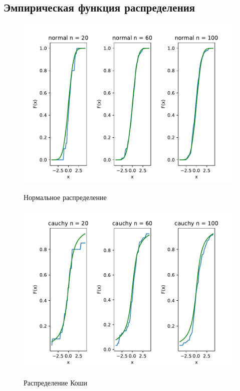 \documentclass[a4paper]{article}
\begin{document}
	
	
\subsection{Эмпирическая функция распределения}
	\begin{figure}[H]
	\centering
	\centering
	{\includegraphics[scale=0.5]{src_lab_4/emperical_fun_normal}}
		\caption{Нормальное распределение}
		\label{fig:normal}
	\end{figure}

\begin{figure}[H]
	\centering
	{\includegraphics[scale=0.5]{src_lab_4/emperical_fun_cauchy}}
		\caption{Распределение Коши}
		\label{fig:cauchy}
	\end{figure}
\end{document}
